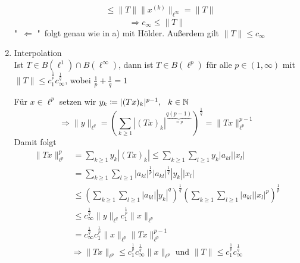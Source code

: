 \begin{beispiel}[Matrizenmultiplikation]
\begin{enumerate}[label=\alph*\upshape)]
\begin{beweis}
\begin{align*}
								  & \leq \| T \| \| x^{(k)} \|_{\ell^{\infty}} = \| T \|
			\end{align*}			
			\[ \Rightarrow c_{\infty} \leq \| T \| \]
			"\ $\Leftarrow$ "\ folgt genau wie in a) mit Hölder. Au{\ss}erdem gilt $\| T \| \leq c_{\infty}$ 
		\end{beweis}
	\item Interpolation \\
		Ist $T \in B(\ell^{1}) \cap B(\ell^{\infty})$, dann ist $T \in B(\ell^{p})$ für alle $p \in (1, \infty)$ mit $\| T \| \leq c_{1}^{\frac{1}{p}} c_{\infty}^{\frac{1}{q}}$, wobei $\frac{1}{p} + \frac{1}{q} = 1$
		\begin{beweis}
		 Für $x \in \ell^{p}$ setzen wir $y_{k} \coloneqq |(T x)_{k}|^{p - 1}, \hspace{0.25cm} k \in \mathbb{N}$ \\
		 \[ \Rightarrow \| y \|_{\ell^{q}} = \left( \sum_{k \geq 1} \left| \left( Tx \right)_{k} \right|^{\underbrace{q(p-1)}_{= p}}  \right)^\frac{1}{q} = \| Tx \|_{\ell^{p}}^{p - 1} \]	
		 Damit folgt
		 \begin{align*}
		 	\| Tx \|_{\ell^{p}}^{p} & = \sum_{k \geq 1 } y_{k} | (Tx)_{k} | \leq \sum_{k \geq 1} \sum_{l \geq 1} y_{k} |a_{kl}| |x_{l}| \\
		 	& = \sum_{k \geq 1} \sum_{l \geq 1} |a_{kl}|^{\frac{1}{p}} |a_{kl}|^{\frac{1}{q}} |y_{k}| |x_{l}| \\
		 	& \leq \left( \sum_{k \geq 1} \sum_{l \geq 1} |a_{kl}| |y_{k}|^{q} \right)^{\frac{1}{q}} \left( \sum_{k \geq 1} \sum_{l \geq 1} |a_{kl}| |x_{l}|^p \right)^{\frac{1}{p}} \\
		 	& \leq c_{\infty}^{\frac{1}{q}} \| y \|_{\ell^{q}} c_{1}^{\frac{1}{p}} \| x \|_{\ell^{p}} \\
		 	& =  c_{\infty}^{\frac{1}{q}} c_{1}^{\frac{1}{p}}  \| x \|_{\ell^{p}} \| Tx \|_{\ell^{p}}^{p - 1} 
		 \end{align*}
		 \[ \Rightarrow \| Tx \|_{\ell^{p}} \leq c_{1}^{\frac{1}{p}} c_{\infty}^{\frac{1}{q}} \| x \|_{\ell^{p}} \text{ und } \| T\| \leq c_{1}^{\frac{1}{p}} c_{\infty}^{\frac{1}{q}} \]
		\end{beweis}
 \end{enumerate}
\end{beispiel}

